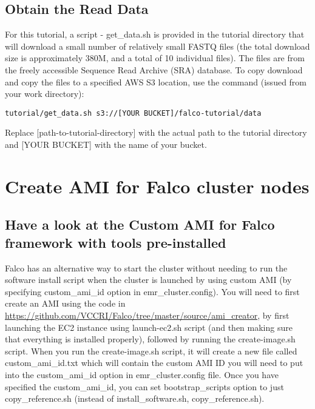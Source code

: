 \documentclass[]{book}
\begin{document}
\hypertarget{obtain-the-read-data}{%
\section{Obtain the Read Data}\label{obtain-the-read-data}}

For this tutorial, a script - get\_data.sh is provided in the tutorial directory that will download a small number of relatively small FASTQ files (the total download size is approximately 380M, and a total of 10 individual files). The files are from the freely accessible Sequence Read Archive (SRA) database. To copy download and copy the files to a specified AWS S3 location, use the command (issued from your work directory):

\begin{verbatim}
tutorial/get_data.sh s3://[YOUR BUCKET]/falco-tutorial/data
\end{verbatim}

Replace {[}path-to-tutorial-directory{]} with the actual path to the tutorial directory and {[}YOUR BUCKET{]} with the name of your bucket.

\hypertarget{create-ami-for-falco-cluster-nodes}{%
\chapter{Create AMI for Falco cluster nodes}\label{create-ami-for-falco-cluster-nodes}}

\hypertarget{have-a-look-at-the-custom-ami-for-falco-framework-with-tools-pre-installed}{%
\section{Have a look at the Custom AMI for Falco framework with tools pre-installed}\label{have-a-look-at-the-custom-ami-for-falco-framework-with-tools-pre-installed}}

Falco has an alternative way to start the cluster without needing to run the software install script when the cluster is launched by using custom AMI (by specifying custom\_ami\_id option in emr\_cluster.config). You will need to first create an AMI using the code in \url{https://github.com/VCCRI/Falco/tree/master/source/ami_creator}, by first launching the EC2 instance using launch-ec2.sh script (and then making sure that everything is installed properly), followed by running the create-image.sh script. When you run the create-image.sh script, it will create a new file called custom\_ami\_id.txt which will contain the custom AMI ID you will need to put into the custom\_ami\_id option in emr\_cluster.config file. Once you have specified the custom\_ami\_id, you can set bootstrap\_scripts option to just copy\_reference.sh (instead of install\_software.sh, copy\_reference.sh).
\end{document}

